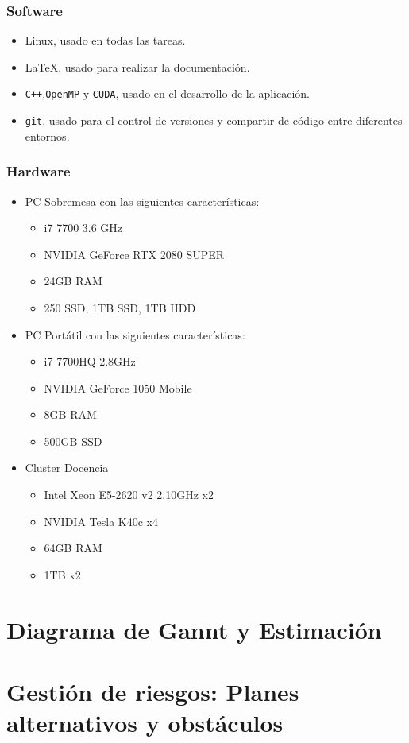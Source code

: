\documentclass[titlepage,12pt]{report}
\begin{document}
\subsubsection{Software}

\begin{itemize}
	\item Linux, usado en todas las tareas.
	\item \LaTeX , usado para realizar la documentación.
	\item \texttt{C++},\texttt{OpenMP} y \texttt{CUDA}, usado en el desarrollo de la aplicación.
	\item \texttt{git}, usado para el control de versiones y compartir de código entre diferentes entornos.
\end{itemize}

\subsubsection{Hardware}

\begin{itemize}
	\item PC Sobremesa con las siguientes características:
		\begin{itemize}
			\item i7 7700 3.6 GHz
			\item NVIDIA GeForce RTX 2080 SUPER
			\item 24GB RAM
			\item 250 SSD, 1TB SSD, 1TB HDD
		\end{itemize}
	\item PC Portátil con las siguientes características:
		\begin{itemize}
			\item i7 7700HQ 2.8GHz
			\item NVIDIA GeForce 1050 Mobile
			\item 8GB RAM
			\item 500GB SSD
		\end{itemize}
	\item Cluster Docencia
		\begin{itemize}
			\item Intel Xeon E5-2620 v2 2.10GHz x2
			\item NVIDIA Tesla K40c x4
			\item 64GB RAM 
			\item 1TB x2
		\end{itemize}
\end{itemize}


\section{Diagrama de Gannt y Estimación}

\section{Gestión de riesgos: Planes alternativos y obstáculos}
\end{document}
